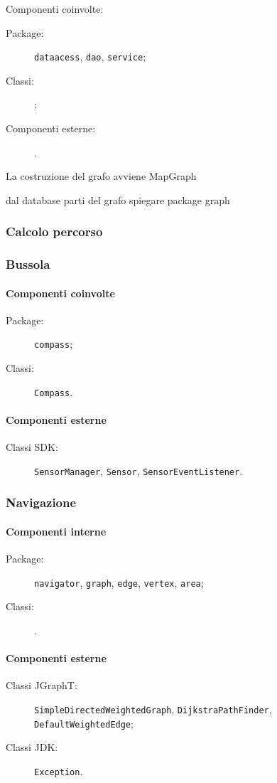 			Componenti coinvolte:
			\begin{description}
				\item[Package:] \verb|dataacess|, \verb|dao|, \verb|service|;
				\item[Classi:] \verb||;
				\item[Componenti esterne:] .
			\end{description}
			
			La costruzione del grafo avviene 
				MapGraph
				
				
			dal database
			parti del grafo
			spiegare package graph
			
			
		
		\subsubsection{Calcolo percorso}
		
		\subsubsection{Bussola}
		
			\paragraph*{Componenti coinvolte}
			\begin{description}
				\item[Package:] \verb|compass|;
				\item[Classi:] \verb|Compass|.
			\end{description}

			\paragraph*{Componenti esterne}
			\begin{description}
				\item[Classi SDK:] \verb|SensorManager|, \verb|Sensor|, \verb|SensorEventListener|.
			\end{description}
			
			
			
		
		\subsubsection{Navigazione}
		
			\paragraph*{Componenti interne}
			\begin{description}
				\item[Package:] \verb|navigator|, \verb|graph|, \verb|edge|, \verb|vertex|, \verb|area|;
				\item[Classi:] \verb||.
			\end{description}
			
			\paragraph*{Componenti esterne}
			\begin{description}
				\item[Classi JGraphT:] \verb|SimpleDirectedWeightedGraph|, \verb|DijkstraPathFinder|, \verb|DefaultWeightedEdge|;
				\item[Classi JDK:] \verb|Exception|.
			\end{description}